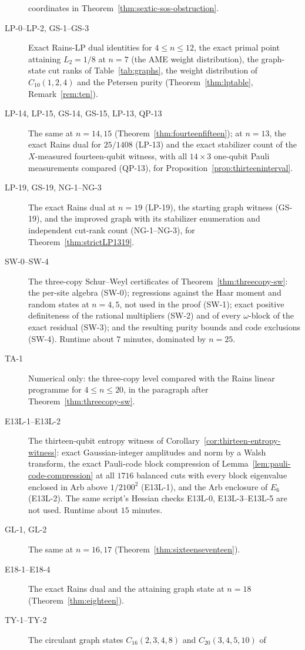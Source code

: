 \begin{description}
coordinates in Theorem~\ref{thm:sextic-sos-obstruction}.
\item[LP-0--LP-2, GS-1--GS-3] Exact Rains-LP dual identities for $4\le n\le12$, the exact primal point attaining $L_2=1/8$ at
$n=7$ (the AME weight distribution), the graph-state cut ranks
of Table~\ref{tab:graphs}, the weight distribution of $C_{10}(1,2,4)$ and the Petersen purity
(Theorem~\ref{thm:lptable}, Remark~\ref{rem:ten}).
\item[LP-14, LP-15, GS-14, GS-15, LP-13, QP-13] The same at $n=14,15$ (Theorem~\ref{thm:fourteenfifteen}); at $n=13$, the
exact Rains dual for $25/1408$ (LP-13) and the exact stabilizer count of the $X$-measured fourteen-qubit witness,
with all $14\times3$ one-qubit Pauli measurements compared (QP-13), for Proposition~\ref{prop:thirteeninterval}.
\item[LP-19, GS-19, NG-1--NG-3] The exact Rains dual at $n=19$ (LP-19), the starting graph witness (GS-19), and the
improved graph with its stabilizer enumeration and independent cut-rank count (NG-1--NG-3), for
Theorem~\ref{thm:strictLP1319}.
\item[SW-0--SW-4] The three-copy Schur--Weyl certificates of Theorem~\ref{thm:threecopy-sw}: the per-site algebra
(SW-0); regressions against the Haar moment and random states at $n=4,5$, not used in the proof (SW-1); exact
positive definiteness of the rational multipliers (SW-2) and of every $\omega$-block of the exact residual (SW-3);
and the resulting purity bounds and code exclusions (SW-4). Runtime about $7$ minutes, dominated by $n=25$.
\item[TA-1] Numerical only: the three-copy level compared with the Rains linear programme for $4\le n\le20$, in the
paragraph after Theorem~\ref{thm:threecopy-sw}.
\item[E13L-1--E13L-2] The thirteen-qubit entropy witness of Corollary~\ref{cor:thirteen-entropy-witness}: exact
Gaussian-integer amplitudes and norm by a Walsh transform, the exact Pauli-code block compression of
Lemma~\ref{lem:pauli-code-compression} at all $1716$ balanced cuts with every block eigenvalue enclosed in Arb above
$1/2100^2$ (E13L-1), and the Arb enclosure of $E_6$ (E13L-2). The same script's Hessian checks E13L-0, E13L-3--E13L-5 are not used.
Runtime about $15$ minutes.
\item[GL-1, GL-2] The same at $n=16,17$ (Theorem~\ref{thm:sixteenseventeen}).
\item[E18-1--E18-4] The exact Rains dual and the attaining graph state at $n=18$ (Theorem~\ref{thm:eighteen}).
\item[TY-1--TY-2] The circulant graph states $C_{16}(2,3,4,8)$ and $C_{20}(3,4,5,10)$ of

\end{description}
